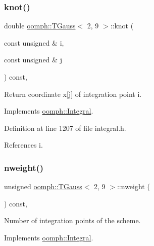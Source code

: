 \subsubsection{\texorpdfstring{knot()}{knot()}}
{\footnotesize\ttfamily double \hyperlink{classoomph_1_1TGauss}{oomph\+::\+T\+Gauss}$<$ 2, 9 $>$\+::knot (\begin{DoxyParamCaption}\item[{const unsigned \&}]{i,  }\item[{const unsigned \&}]{j }\end{DoxyParamCaption}) const\hspace{0.3cm}{\ttfamily [inline]}, {\ttfamily [virtual]}}



Return coordinate x\mbox{[}j\mbox{]} of integration point i. 



Implements \hyperlink{classoomph_1_1Integral_a1a2122f99a87c18649bafdd9ed739758}{oomph\+::\+Integral}.



Definition at line 1207 of file integral.\+h.



References i.

\mbox{\label{classoomph_1_1TGauss_3_012_00_019_01_4_a15395b941db320798a5aad731dd6848a}} 
\subsubsection{\texorpdfstring{nweight()}{nweight()}}
{\footnotesize\ttfamily unsigned \hyperlink{classoomph_1_1TGauss}{oomph\+::\+T\+Gauss}$<$ 2, 9 $>$\+::nweight (\begin{DoxyParamCaption}{ }\end{DoxyParamCaption}) const\hspace{0.3cm}{\ttfamily [inline]}, {\ttfamily [virtual]}}



Number of integration points of the scheme. 



Implements \hyperlink{classoomph_1_1Integral_a1a270de9d99a1fcf1d25a6c1017f65fa}{oomph\+::\+Integral}.



